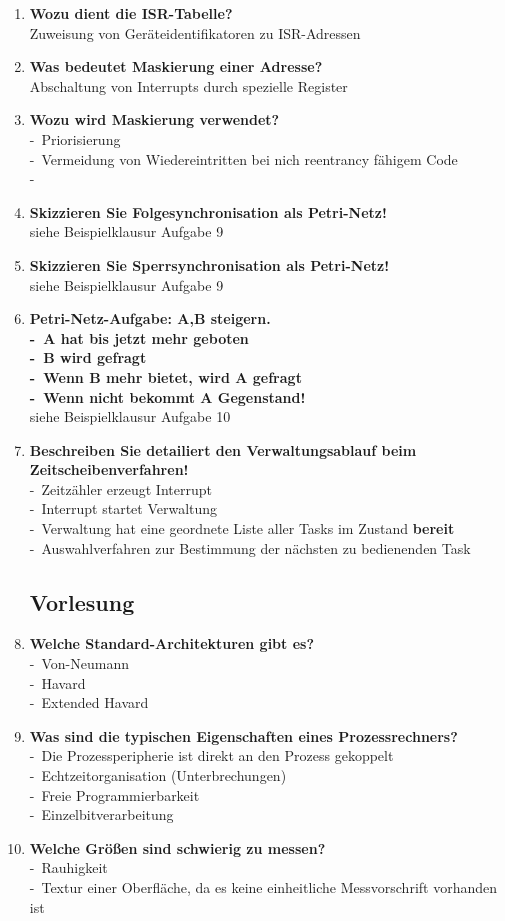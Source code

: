 \documentclass[a4paper,12pt]{article}
\newcommand{\questionnopage}[2]{\pagebreak[3]\item {\textbf{#1?}}#2}
\newcommand{\statementnopage}[2]{\pagebreak[3]\item {\textbf{#1!}}#2}
\newcommand{\catchword}[1]{\\-\ #1}
\newcommand{\normaltext}[1]{\\#1}
\newcommand{\important}[1]{\textbf{#1}}
\begin{document}
\begin{enumerate}
  \questionnopage{Wozu dient die ISR-Tabelle}
  {
    \normaltext{Zuweisung von Geräteidentifikatoren zu ISR-Adressen}
  }
  
  \questionnopage{Was bedeutet Maskierung einer Adresse}
  {
    \normaltext{Abschaltung von Interrupts durch spezielle Register}
  }
  
  \questionnopage{Wozu wird Maskierung verwendet}
  {
    \catchword{Priorisierung}
    \catchword{Vermeidung von Wiedereintritten bei nich reentrancy fähigem Code}
    \catchword{}
  }
  
  \statementnopage{Skizzieren Sie Folgesynchronisation als Petri-Netz}
  {
  \normaltext{siehe Beispielklausur Aufgabe 9}
  }
  
  \statementnopage{Skizzieren Sie Sperrsynchronisation als Petri-Netz}
  {
  \normaltext{siehe Beispielklausur Aufgabe 9}
  }
  
  \statementnopage{Petri-Netz-Aufgabe: A,B steigern. \catchword{A hat bis jetzt mehr geboten}
  \catchword{B wird gefragt} \catchword{Wenn B mehr bietet, wird A gefragt} \catchword{Wenn
  nicht bekommt A Gegenstand}}
  {
  \normaltext{siehe Beispielklausur Aufgabe 10}
  }
  
  \statementnopage{Beschreiben Sie detailiert den Verwaltungsablauf beim Zeitscheibenverfahren}
  {
  \catchword{Zeitzähler erzeugt Interrupt}
  \catchword{Interrupt startet Verwaltung}
  \catchword{Verwaltung hat eine geordnete Liste aller Tasks im Zustand \important{bereit}}
  \catchword{Auswahlverfahren zur Bestimmung der nächsten zu bedienenden Task}
  }

  \subsection{Vorlesung}

  \questionnopage{Welche Standard-Architekturen gibt es}
  {
    \catchword{Von-Neumann}
    \catchword{Havard}
    \catchword{Extended Havard}
  }

  \questionnopage{Was sind die typischen Eigenschaften eines Prozessrechners}
  {
    \catchword{Die Prozessperipherie ist direkt an den Prozess gekoppelt}
    \catchword{Echtzeitorganisation (Unterbrechungen)}
    \catchword{Freie Programmierbarkeit}
    \catchword{Einzelbitverarbeitung}
  }

  \questionnopage{Welche Größen sind schwierig zu messen}
  {
    \catchword{Rauhigkeit}
    \catchword{Textur einer Oberfläche, da es keine einheitliche Messvorschrift vorhanden ist}
  }


\end{enumerate}
\end{document}
